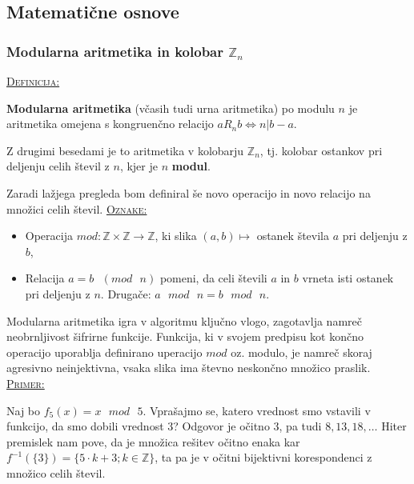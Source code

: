 \documentclass[a4paper, 12pt]{article} %
\newcommand{\Zn}{\mathbb{Z}_n}
\newenvironment{matematika}[1]{
\textcolor{bostonuniversityred}{\underline{\textsc{#1:}}}
}{
}
\begin{document}
\subsection{Matematične osnove}

\subsubsection{Modularna aritmetika in kolobar $\Zn$}

\begin{matematika}{Definicija}
\textbf{Modularna aritmetika} (včasih tudi urna aritmetika) po modulu $n$ je aritmetika omejena s kongruenčno relacijo $a R_n b \iff n | b - a$.

Z drugimi besedami je to aritmetika v kolobarju $\Zn$, tj. kolobar ostankov pri deljenju celih števil z $n$, kjer je $n$ \textbf{modul}.
\end{matematika}
\newline
\newline
Zaradi lažjega pregleda bom definiral še novo operacijo in novo relacijo na množici celih števil.
\newline
\newline
\begin{matematika}{Oznake}
\begin{itemize}[label=]
\item Operacija $mod : \mathbb{Z} \times \mathbb{Z} \to \mathbb{Z}$, ki slika $(a, b) \mapsto$ ostanek števila $a$ pri deljenju z $b$,
\item Relacija $a = b \text{ }(mod  \text{ } n)$ pomeni, da celi števili $a$ in $b$ vrneta isti ostanek pri deljenju z $n$. Drugače: $a \text{ } mod \text{ } n = b \text{ } mod \text{ } n$. 
\end{itemize}
\end{matematika}


Modularna aritmetika igra v algoritmu ključno vlogo, zagotavlja namreč neobrnljivost šifrirne funkcije. Funkcija, ki v svojem predpisu kot končno operacijo uporablja definirano uperacijo $mod$ oz. modulo, je namreč skoraj agresivno neinjektivna, vsaka slika ima števno neskončno množico praslik.
\newline
\newline
\begin{matematika}{Primer}
Naj bo $f_5(x) = x \text{ } mod \text{ } 5$. Vprašajmo se, katero vrednost smo vstavili v funkcijo, da smo dobili vrednost $3$?
\newline
Odgovor je očitno $3$, pa tudi $8, 13, 18, \dots$ Hiter premislek nam pove, da je množica rešitev očitno enaka kar $f^{-1}(\{ 3 \}) = \{ 5 \cdot k + 3; k \in \mathbb{Z} \}$, ta pa je v očitni bijektivni korespondenci z množico celih števil.
\end{matematika}
\end{document}
